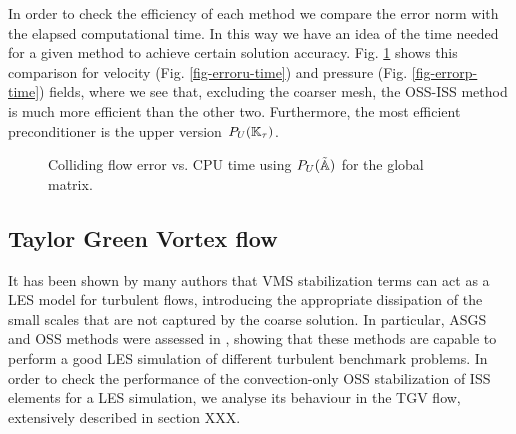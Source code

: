 In order to check the efficiency of each method we compare the error norm with the elapsed computational time. In this way we have an idea of the time needed for a given method to achieve certain solution accuracy. Fig. \ref{fig-error-time} shows this comparison for velocity (Fig. \ref{fig-erroru-time}) and pressure (Fig. \ref{fig-errorp-time}) fields, where we see that, excluding the coarser mesh, the OSS-ISS method is much more efficient than the other two. Furthermore, the most efficient preconditioner is the upper version $P_U(\mathbb{K}_\tau)$.
\begin{figure}[h!]
  \centering
  \caption{Colliding flow error vs. CPU time using $P_U(\tilde{\mathbb{A}})$ for the global matrix.}
  \label{fig-error-time}
\end{figure}

\subsection{Taylor Green Vortex flow}
\label{subsec-C5_TGV-VMS}
It has been shown by many authors that VMS stabilization terms can act as a LES model for turbulent flows, introducing the appropriate dissipation of the small scales that are not captured by the coarse solution. In particular, ASGS and OSS methods were assessed in \cite{colomes_assessment_2015}, showing that these methods are capable to perform a good LES simulation of different turbulent benchmark problems.
In order to check the performance of the convection-only OSS stabilization of ISS elements for a LES simulation, we analyse its behaviour in the TGV flow, extensively described in section XXX. 

